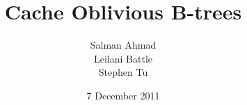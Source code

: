 \documentclass{style}
\begin{document}
\title{Cache Oblivious B-trees}
%
%
%
%
%

%
\author{
%
%
\alignauthor
Salman Ahmad\\
\alignauthor
Leilani Battle\\
\alignauthor
Stephen Tu\\
}
\date{7 December 2011}
\end{document}
